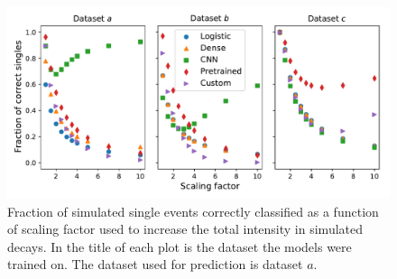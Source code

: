 \begin{figure}
\centering
\includegraphics[width=\textwidth]{chapters/results/figures/simulated_scaled_intensity.pdf}
\caption{\label{fig:simulated-scaled-intensities}Fraction of simulated single events correctly classified
as a function of scaling factor used to increase the total intensity in simulated decays. In the title of
each plot is the dataset the models were trained on. The dataset used for prediction is dataset $a$.}
\end{figure}